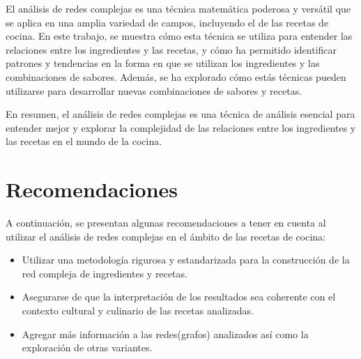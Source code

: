 \documentclass[a4paper]{article}
\begin{document}
El análisis de redes complejas es una técnica matemática poderosa y versátil que
se aplica en una amplia variedad de campos, incluyendo el de las recetas de
cocina. En este trabajo, se muestra cómo esta técnica se utiliza para entender
las relaciones entre los ingredientes y las recetas, y cómo ha permitido
identificar patrones y tendencias en la forma en que se utilizan los
ingredientes y las combinaciones de sabores. Además, se ha explorado cómo estás
técnicas pueden utilizarse para desarrollar nuevas combinaciones de sabores y
recetas.

En resumen, el análisis de redes complejas es una técnica de análisis esencial
para entender mejor y explorar la complejidad de las relaciones entre los
ingredientes y las recetas en el mundo de la cocina.




\section{Recomendaciones}\label{sec:rec}

A continuación, se presentan algunas recomendaciones a tener en cuenta al
utilizar el análisis de redes complejas en el ámbito de las recetas de cocina:
\begin{itemize}
	\item Utilizar una metodología rigurosa y estandarizada para la construcción
	de la red compleja de ingredientes y recetas.
	\item Asegurarse de que la interpretación de los resultados sea coherente
	con el contexto cultural y culinario de las recetas analizadas.
	\item Agregar más información a las redes(grafos) analizados así como la
	exploración de otras variantes.
\end{itemize}

\end{document}
